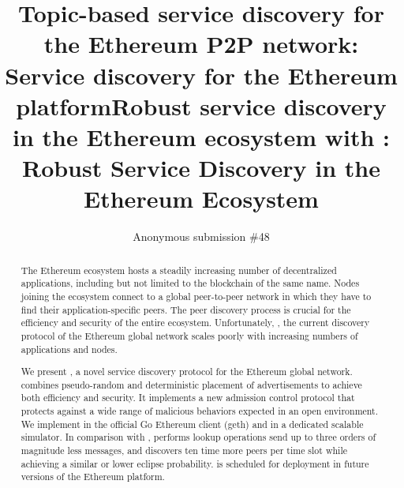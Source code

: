 \documentclass[compsoc, conference, a4paper, 10pt, times]{IEEEtran}
\begin{document}
\title{Topic-based service discovery for the Ethereum P2P network}
\title{\sysname: Service discovery for the Ethereum platform}
\title{Robust service discovery in the Ethereum ecosystem with \sysname}
\title{\sysname: Robust Service Discovery in the Ethereum Ecosystem}
\author{Anonymous submission \#48}
\maketitle
\begin{abstract}

The Ethereum ecosystem hosts a steadily increasing number of decentralized applications, including but not limited to the blockchain of the same name. Nodes joining the ecosystem connect to a global peer-to-peer network in which they have to find their application-specific peers. The peer discovery process is crucial for the efficiency and security of the entire ecosystem. Unfortunately, \discv, the current discovery protocol of the Ethereum global network scales poorly with increasing numbers of applications and nodes.

We present \sysname, a novel service discovery protocol for the Ethereum global network. \sysname combines pseudo-random and deterministic placement of advertisements to achieve both efficiency and security. It implements a new admission control protocol that protects against a wide range of malicious behaviors expected in an open environment. 
We implement \sysname in the official Go Ethereum client (geth) and in a dedicated scalable simulator.
In comparison with \discv, \sysname performs lookup operations send up to three orders of magnitude less messages, and discovers ten time more peers per time slot while achieving a similar or lower eclipse probability. 
\sysname is scheduled for deployment in future versions of the Ethereum platform.
\end{abstract}





















%
\clearpage



\end{document}
